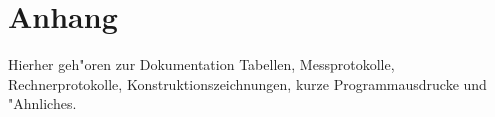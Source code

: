 \newpage
\chapter*{Anhang}
Hierher geh"oren zur Dokumentation Tabellen, Messprotokolle,
Rechnerprotokolle, Konstruktionszeichnungen, kurze Programmausdrucke
und "Ahnliches.
